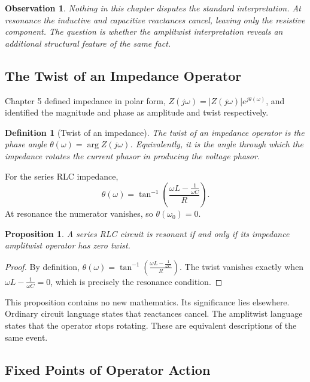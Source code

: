 \documentclass[12pt]{article}
\newtheorem{definition}{Definition}
\newtheorem{proposition}{Proposition}
\newtheorem{observation}{Observation}
\begin{document}
\begin{observation}
Nothing in this chapter disputes the standard interpretation. At resonance the inductive and capacitive reactances cancel, leaving only the resistive component. The question is whether the amplitwist interpretation reveals an additional structural feature of the same fact.
\end{observation}

\subsection{The Twist of an Impedance Operator}

Chapter 5 defined impedance in polar form, $Z(j\omega)=|Z(j\omega)|e^{j\theta(\omega)}$, and identified the magnitude and phase as amplitude and twist respectively.

\begin{definition}[Twist of an impedance]
The twist of an impedance operator is the phase angle $\theta(\omega)=\arg Z(j\omega)$. Equivalently, it is the angle through which the impedance rotates the current phasor in producing the voltage phasor.
\end{definition}

For the series RLC impedance,
\[
\theta(\omega)=\tan^{-1}\left(\frac{\omega L-\frac{1}{\omega C}}{R}\right).
\]
At resonance the numerator vanishes, so $\theta(\omega_0)=0$.

\begin{proposition}
A series RLC circuit is resonant if and only if its impedance amplitwist operator has zero twist.
\end{proposition}

\begin{proof}
By definition, $\theta(\omega)=\tan^{-1}\left(\frac{\omega L-\frac{1}{\omega C}}{R}\right)$. The twist vanishes exactly when $\omega L-\frac{1}{\omega C}=0$, which is precisely the resonance condition.
\end{proof}

This proposition contains no new mathematics. Its significance lies elsewhere. Ordinary circuit language states that reactances cancel. The amplitwist language states that the operator stops rotating. These are equivalent descriptions of the same event.

\subsection{Fixed Points of Operator Action}
\end{document}
